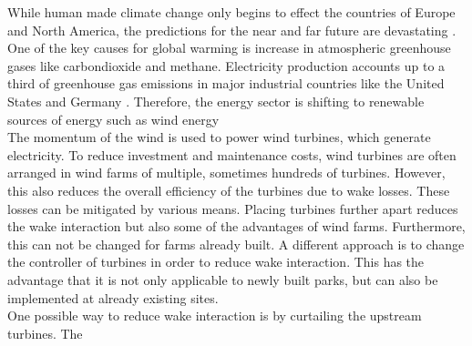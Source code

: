 
While human made climate change only begins to effect the countries of Europe and North America, the predictions for the near and far future are devastating \cite{hoegh-guldberg_impacts_2019}. One of the key causes for global warming is increase in atmospheric greenhouse gases like carbondioxide and methane. Electricity production accounts  up to a third of greenhouse gas emissions in major industrial countries like the United States \cite{hockstad_inventory_2018} and Germany \cite{ortl_entwicklung_2020}. Therefore, the energy sector is shifting to renewable sources of energy such as wind energy \cite{international_energy_agency_global_2020}\\
The momentum of the wind is used to power wind turbines, which generate electricity. To reduce investment and maintenance costs, wind turbines are often arranged in wind farms of multiple, sometimes hundreds of turbines. However, this also reduces the overall efficiency of the turbines due to wake losses. These losses can be mitigated by various means. Placing turbines further apart reduces the wake interaction but also some of the advantages of wind farms. Furthermore, this can not be changed for farms already built. A different approach is to change the controller of turbines in order to reduce wake interaction. This has the advantage that it is not only applicable to newly built parks, but can also be implemented at already existing sites. \\
One possible way to reduce wake interaction is by curtailing the upstream turbines. The
